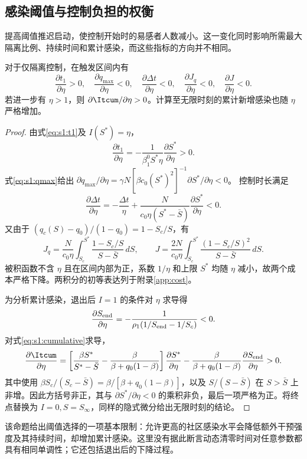 \subsection{感染阈值与控制负担的权衡}
提高阈值推迟启动，使控制开始时的易感者人数减小。这一变化同时影响所需最大隔离比例、持续时间和累计感染，而这些指标的方向并不相同。
\begin{proposition}
\label{prop:threshold-tradeoff}\label{prop:s1:sensitivity}
对于仅隔离控制，在触发区间内有
\begin{equation}
\frac{\partial t_1}{\partial\eta}>0,\quad
\frac{\partial q_{\max}}{\partial\eta}<0,\quad
\frac{\partial\Delta t}{\partial\eta}<0,\quad
\frac{\partial J_q}{\partial\eta}<0,\quad
\frac{\partial J}{\partial\eta}<0.
\label{eq:threshold-tradeoff}
\end{equation}
若进一步有 $\eta>1$，则 $\partial\Itcum/\partial\eta>0$。计算至无限时刻的累计新增感染也随 $\eta$ 严格增加。
\end{proposition}
\begin{proof}
由式\eqref{eq:s1:t1}及 $I(S^*)=\eta$，
\[
\frac{\partial t_1}{\partial\eta}
=-\frac1{\beta_1^0 S^*\eta}\frac{\partial S^*}{\partial\eta}>0.
\]
式\eqref{eq:s1:qmax}给出
$\partial q_{\max}/\partial\eta=\gamma N[\beta c_0(S^*)^2]^{-1}\partial S^*/\partial\eta<0$。
控制时长满足
\[
\frac{\partial\Delta t}{\partial\eta}
=-\frac{\Delta t}{\eta}
+\frac{N}{c_0\eta(S^*-\bar S)}\frac{\partial S^*}{\partial\eta}<0.
\]
又由于 $(q_c(S)-q_0)/(1-q_0)=1-S_c/S$，有
\begin{equation}
J_q=\frac{N}{c_0\eta}\int_{S_c}^{S^*}\frac{1-S_c/S}{S-\bar S}\,dS,
\qquad
J=\frac{2N}{c_0\eta}\int_{S_c}^{S^*}\frac{(1-S_c/S)^2}{S-\bar S}\,dS.
\label{eq:cost:state}
\end{equation}
被积函数不含 $\eta$ 且在区间内部为正，系数 $1/\eta$ 和上限 $S^*$ 均随 $\eta$ 减小，故两个成本严格下降。两积分的初等表达列于附录\ref{app:cost}。

为分析累计感染，退出后 $I=1$ 的条件对 $\eta$ 求导得
\[
\frac{\partial S_{\rm end}}{\partial\eta}
=-\frac1{\rho_1(1/S_{\rm end}-1/S_c)}<0.
\]
对式\eqref{eq:s1:cumulative}求导，
\begin{equation}
\frac{\partial\Itcum}{\partial\eta}
=\left[\frac{\beta S^*}{S^*-\bar S}-\frac{\beta}{\beta+q_0(1-\beta)}\right]\frac{\partial S^*}{\partial\eta}
-\frac{\beta}{\beta+q_0(1-\beta)}\frac{\partial S_{\rm end}}{\partial\eta}>0.
\label{eq:cumulative-eta}
\end{equation}
其中使用 $\beta S_c/(S_c-\bar S)=\beta/[\beta+q_0(1-\beta)]$，以及 $S/(S-\bar S)$ 在 $S>\bar S$ 上非增。因此方括号非正，其与 $\partial S^*/\partial\eta<0$ 的乘积非负，最后一项严格为正。将终点替换为 $I=0,S=S_\infty$，同样的隐式微分给出无限时刻的结论。
\end{proof}
该命题给出阈值选择的一项基本限制：允许更高的社区感染水平会降低额外干预强度及其持续时间，却增加累计感染。这里没有据此断言动态清零时间对任意参数都具有相同单调性；它还包括退出后的下降过程。

